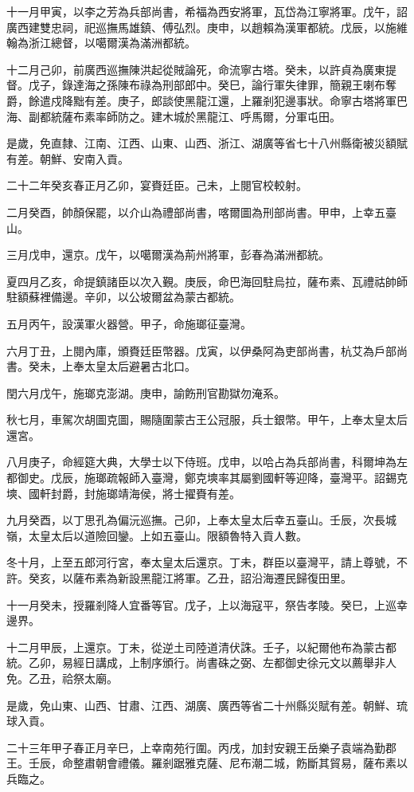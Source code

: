 \begin{pinyinscope}
十一月甲寅，以李之芳為兵部尚書，希福為西安將軍，瓦岱為江寧將軍。戊午，詔廣西建雙忠祠，祀巡撫馬雄鎮、傅弘烈。庚申，以趙賴為漢軍都統。戊辰，以施維翰為浙江總督，以噶爾漢為滿洲都統。

十二月己卯，前廣西巡撫陳洪起從賊論死，命流寧古塔。癸未，以許貞為廣東提督。戊子，錄達海之孫陳布祿為刑部郎中。癸巳，論行軍失律罪，簡親王喇布奪爵，餘遣戍降黜有差。庚子，郎談使黑龍江還，上羅剎犯邊事狀。命寧古塔將軍巴海、副都統薩布素率師防之。建木城於黑龍江、呼馬爾，分軍屯田。

是歲，免直隸、江南、江西、山東、山西、浙江、湖廣等省七十八州縣衛被災額賦有差。朝鮮、安南入貢。

二十二年癸亥春正月乙卯，宴賚廷臣。己未，上閱官校較射。

二月癸酉，帥顏保罷，以介山為禮部尚書，喀爾圖為刑部尚書。甲申，上幸五臺山。

三月戊申，還京。戊午，以噶爾漢為荊州將軍，彭春為滿洲都統。

夏四月乙亥，命提鎮諸臣以次入覲。庚辰，命巴海回駐烏拉，薩布素、瓦禮祜帥師駐額蘇裡備邊。辛卯，以公坡爾盆為蒙古都統。

五月丙午，設漢軍火器營。甲子，命施瑯征臺灣。

六月丁丑，上閱內庫，頒賚廷臣幣器。戊寅，以伊桑阿為吏部尚書，杭艾為戶部尚書。癸未，上奉太皇太后避暑古北口。

閏六月戊午，施瑯克澎湖。庚申，諭飭刑官勘獄勿淹系。

秋七月，車駕次胡圖克圖，賜隨圍蒙古王公冠服，兵士銀幣。甲午，上奉太皇太后還宮。

八月庚子，命經筵大典，大學士以下侍班。戊申，以哈占為兵部尚書，科爾坤為左都御史。戊辰，施瑯疏報師入臺灣，鄭克塽率其屬劉國軒等迎降，臺灣平。詔錫克塽、國軒封爵，封施瑯靖海侯，將士擢賚有差。

九月癸酉，以丁思孔為偏沅巡撫。己卯，上奉太皇太后幸五臺山。壬辰，次長城嶺，太皇太后以道險回鑾。上如五臺山。限額魯特入貢人數。

冬十月，上至五郎河行宮，奉太皇太后還京。丁未，群臣以臺灣平，請上尊號，不許。癸亥，以薩布素為新設黑龍江將軍。乙丑，詔沿海遷民歸復田里。

十一月癸未，授羅剎降人宜番等官。戊子，上以海寇平，祭告孝陵。癸巳，上巡幸邊界。

十二月甲辰，上還京。丁未，從逆土司陸道清伏誅。壬子，以紀爾他布為蒙古都統。乙卯，易經日講成，上制序頒行。尚書硃之弼、左都御史徐元文以薦舉非人免。乙丑，祫祭太廟。

是歲，免山東、山西、甘肅、江西、湖廣、廣西等省二十州縣災賦有差。朝鮮、琉球入貢。

二十三年甲子春正月辛巳，上幸南苑行圍。丙戌，加封安親王岳樂子袁端為勤郡王。壬辰，命整肅朝會禮儀。羅剎踞雅克薩、尼布潮二城，飭斷其貿易，薩布素以兵臨之。


\end{pinyinscope}
